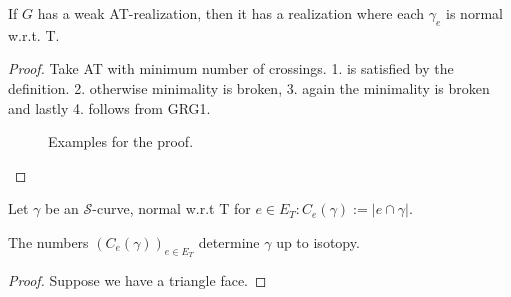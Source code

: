 \begin{claim}
	If $G$ has a weak AT-realization, then it has a realization where each $\gamma_e$ is normal w.r.t. T.
\end{claim}

\begin{proof}
	Take AT with minimum number of crossings. 1. is satisfied by the definition. 2. otherwise minimality is broken, 3. again the minimality is broken and lastly 4. follows from GRG1.
	
	\begin{figure}[!ht]\centering
		\begin{subfigure}{.2\textwidth}\centering
			\caption{}
		\end{subfigure}
		\begin{subfigure}{.2\textwidth}\centering
			\caption{}
		\end{subfigure}
		\begin{subfigure}{.2\textwidth}\centering
			\caption{}
		\end{subfigure}
		\begin{subfigure}{.2\textwidth}\centering
			\caption{}
		\end{subfigure}
		\caption{Examples for the proof.}
	\end{figure}
\end{proof}

\begin{defn}
	Let $\gamma$ be an $\mathcal{S}$-curve, normal w.r.t T for $e \in E_T: C_e(\gamma) := |e \cap \gamma|$.
\end{defn}

\begin{claim}
	The numbers $\left( C_e(\gamma)\right)_{e \in E_T}$ determine $\gamma$ up to isotopy.
\end{claim}

\begin{proof}
	Suppose we have a triangle face.
\end{proof}